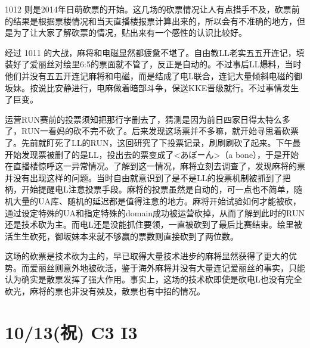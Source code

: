 1012 则是2014年日萌砍票的开始。这几场的砍票情况让人有点措手不及，砍票前的结果是根据票楼情况和当天直播楼报票计算出来的，所以会有不准确的地方，但是为了让大家了解砍票的情况，贴出来有一个感性的认识比较好。

经过 1011 的大战，麻将和电磁显然都疲惫不堪了。自由教LL老实五五开连记，填装好了爱丽丝对绘里6:5的票面就不管了，反正是自动的。不过事后LL爆料，当时他们并没有五五开连记麻将和电磁，而是结成了电L联合，连记大量倾斜电磁的御坂妹。按说比安静进行，电麻做着暗部斗争，保送KKE晋级就行。不过事情发生了巨变。

运营RUN赛前的投票须知把那行字删去了，猜测是因为前日四家日得太特么多了，RUN一看妈的砍不完不砍了。后来发现这场票并不多嘛，就开始寻思着砍票了。先前就盯死了LL的RUN，这回研究了下投票记录，刷刷刷砍了起来。下午最开始发现票被删了的是LL，投出去的票变成了<あぼーん>（a bone），于是开始在直播楼惊呼这一异常情况。了解到这一情况，麻将立刻去调查了，发现麻将的票并没有出现这样的问题。当时自由就意识到了是不是LL的投票机制被抓到了把柄，开始提醒电L注意投票手段。麻将的投票虽然是自动的，可一点也不简单，随机大量的UA库、随机的延迟都是值得注意的地方。麻将开始试验如何才能被砍，通过设定特殊的UA和指定特殊的domain成功被运营砍掉，从而了解到此时的RUN还是技术砍为主。而电L还是没能抓住要领，一直被砍到了最后比赛结束。绘里被活生生砍死，御坂妹本来就不够赢的票数则直接砍到了两位数。

这场的砍票是技术砍为主的，早已取得大量技术进步的麻将显然获得了更大的优势。而爱丽丝则意外地被砍活，鉴于海外麻将并没有大量连记爱丽丝的事实，只能认为确实是散票发挥了强大作用。事实上，这场的技术砍即使是砍电L也没有完全砍光，麻将的票也非没有殃及，散票也有中招的情况。

\section{10/13(祝) C3 I3}


